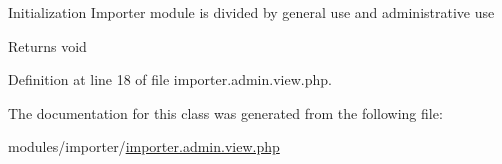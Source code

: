 Initialization Importer module is divided by general use and administrative use ~\newline
\begin{DoxyReturn}{Returns}
void 
\end{DoxyReturn}


Definition at line 18 of file importer.\+admin.\+view.\+php.



The documentation for this class was generated from the following file\+:\begin{DoxyCompactItemize}
\item 
modules/importer/\hyperlink{importer_8admin_8view_8php}{importer.\+admin.\+view.\+php}\end{DoxyCompactItemize}
